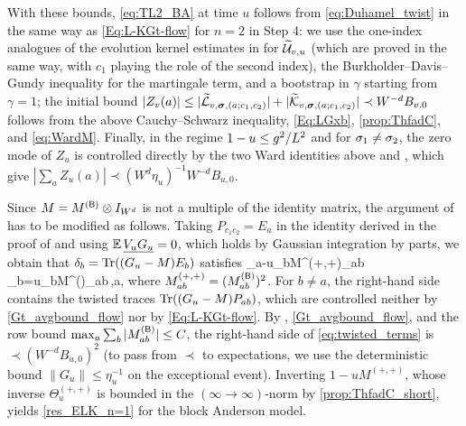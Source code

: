 With these bounds, \eqref{eq:TL2_BA} at time $u$ follows from \eqref{eq:Duhamel_twist} in the same way as \eqref{Eq:L-KGt-flow} for $n=2$ in Step 4: we use the one-index analogues of the evolution kernel estimates in  for $\widetilde{\mathcal U}_{v,u}$ (which are proved in the same way, with $c_1$ playing the role of the second index), the Burkholder--Davis--Gundy inequality for the martingale term, and a bootstrap in $\gamma$ starting from $\gamma=1$; the initial bound $|Z_v(a)|\le|\widetilde{\mathcal L}_{v,{\boldsymbol{\sigma}},(a;c_1,c_2)}|+|\widetilde{\mathcal K}_{v,{\boldsymbol{\sigma}},(a;c_1,c_2)}|\prec W^{-d}B_{v,0}$ follows from the above Cauchy--Schwarz inequality, \eqref{Eq:LGxb}, \eqref{prop:ThfadC}, and \eqref{eq:WardM}. Finally, in the regime $1-u\le g^2/L^2$ and for $\sigma_1\ne\sigma_2$, the zero mode of $Z_u$ is controlled directly by the two Ward identities above and , which give $|\sum_aZ_u(a)|\prec (W^d\eta_u)^{-1}W^{-d}B_{u,0}$.

\medskip
{}
Since $M=M^{({\mathsf{B}})}\otimes I_{W^d}$ is not a multiple of the identity matrix, the argument of \cite[Lemma 5.15]{YY_25} has to be modified as follows. Taking $P_{c_1c_2}=E_a$ in the identity derived in the proof of  and using $\mathbb{E}\,\underline{V_uG_u}=0$, which holds by Gaussian integration by parts, we obtain that $\delta_b=\operatorname{Tr}((G_u-M)E_b)$ satisfies
\be\label{eq:twisted_terms}
\E\delta_a-u\sum_{b}M^{(+,+)}_{ab}\,\E\delta_b=u\sum_{b}M^{(\sB)}_{ab}\,\E{},\qquad a\in\Zn,
\ee
where $M^{(+,+)}_{ab}=(M^{({\mathsf{B}})}_{ab})^2$. For $b\ne a$, the right-hand side contains the twisted traces $\operatorname{Tr}((G_u-M)P_{ab})$, which are controlled neither by \eqref{Gt_avgbound_flow} nor by \eqref{Eq:L-KGt-flow}. By , \eqref{Gt_avgbound_flow}, and the row bound $\max_a\sum_b|M^{({\mathsf{B}})}_{ab}|\le C$, the right-hand side of \eqref{eq:twisted_terms} is $\prec(W^{-d}B_{u,0})^2$ (to pass from $\prec$ to expectations, we use the deterministic bound $\|G_u\|\le\eta_u^{-1}$ on the exceptional event). Inverting $1-uM^{(+,+)}$, whose inverse $\Theta^{(+,+)}_u$ is bounded in the $(\infty\to\infty)$-norm by \eqref{prop:ThfadC_short}, yields \eqref{res_ELK_n=1} for the block Anderson model.




